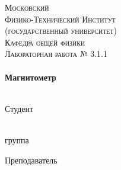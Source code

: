 \begin{titlepage}
\center %
 

\textsc{\LARGE Московский\\[-0.2cm]Физико-Технический Институт\\[0.1cm]\large (государственный университет)}\\[1.5cm] %
\textsc{\Large Кафедра общей физики}\\[0.1cm] %
\textsc{\large Лабораторная работа № 3.1.1}\\[0.5cm] %


\HRule
\\[0.6cm]
{ \huge \bfseries Магнитометр}
\\[0.3cm] %
\HRule
\\[1.5cm]


 

\begin{minipage}[t]{0.48\textwidth}
	\begin{flushleft} \large
		\textsf{Студент}\bigskip
		
		  \\[5mm]
		\underline{\hspace{30mm}} группа
	\end{flushleft}
\end{minipage}
\hfill
\begin{minipage}[t]{0.48\textwidth}
	\begin{flushright} \large
		\textsf{Преподаватель}\bigskip
		
		  \\[5mm]
	\end{flushright}
\end{minipage}


\end{titlepage}
